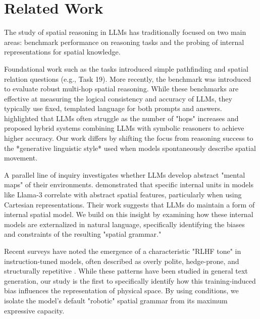 \section{Related Work}
\label{sec:related}

The study of spatial reasoning in LLMs has traditionally focused on two main areas: benchmark performance on reasoning tasks and the probing of internal representations for spatial knowledge.

Foundational work such as the \babi tasks \cite{weston2015towards} introduced simple pathfinding and spatial relation questions (e.g., Task 19). More recently, the \stepgame benchmark \cite{shi2022stepgame} was introduced to evaluate robust multi-hop spatial reasoning. While these benchmarks are effective at measuring the logical consistency and accuracy of LLMs, they typically use fixed, templated language for both prompts and answers. \citet{li2024advancing} highlighted that LLMs often struggle as the number of "hops" increases and proposed hybrid systems combining LLMs with symbolic reasoners to achieve higher accuracy. Our work differs by shifting the focus from reasoning success to the *generative linguistic style* used when models spontaneously describe spatial movement.

A parallel line of inquiry investigates whether LLMs develop abstract "mental maps" of their environments. \citet{martorell2025text} demonstrated that specific internal units in models like Llama-3 correlate with abstract spatial features, particularly when using Cartesian representations. Their work suggests that LLMs do maintain a form of internal spatial model. We build on this insight by examining how these internal models are externalized in natural language, specifically identifying the biases and constraints of the resulting "spatial grammar."

Recent surveys have noted the emergence of a characteristic "RLHF tone" in instruction-tuned models, often described as overly polite, hedge-prone, and structurally repetitive \cite{zha2025survey}. While these patterns have been studied in general text generation, our study is the first to specifically identify how this training-induced bias influences the representation of physical space. By using \humanprompt conditions, we isolate the model's default "robotic" spatial grammar from its maximum expressive capacity.
